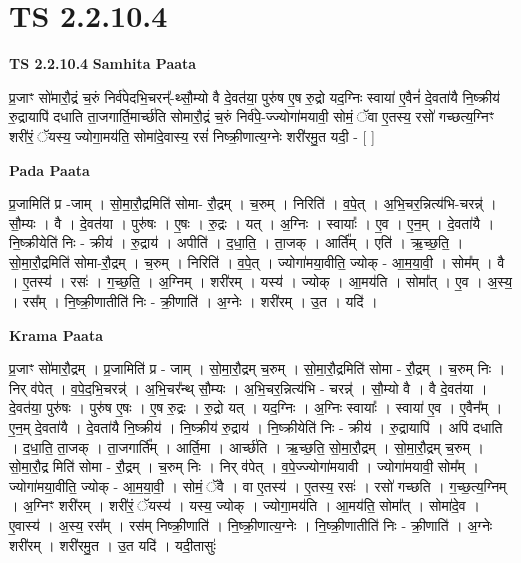 \documentclass[17pt]{extarticle}
\begin{document}
\section{ TS 2.2.10.4 }

\textbf{TS 2.2.10.4 } \newline
\textbf{Samhita Paata} \newline

प्र॒जाꣳ सो॑मारौ॒द्रं च॒रुं निर्व॑पेदभि॒चरन्᳚-थ्सौ॒म्यो वै दे॒वत॑या॒ पुरु॑ष ए॒ष रु॒द्रो यद॒ग्निः स्वाया॑ ए॒वैनं॑ दे॒वता॑यै नि॒ष्क्रीय॑ रु॒द्रायापि॑ दधाति ता॒जगार्ति॒मार्च्छ॑ति सोमारौ॒द्रं च॒रुं निर्व॑पे॒-ज्ज्योगा॑मयावी॒ सोमं॒ ॅवा ए॒तस्य॒ रसो॑ गच्छत्य॒ग्निꣳ शरी॑रं॒ ॅयस्य॒ ज्योगा॒मय॑ति॒ सोमा॑दे॒वास्य॒ रसं॑ निष्क्री॒णात्य॒ग्नेः शरी॑रमु॒त यदी॒ - [  ] \newline

\textbf{Pada Paata} \newline

प्र॒जामिति॑ प्र -जाम् । सो॒मा॒रौ॒द्रमिति॑ सोमा- रौ॒द्रम् । च॒रुम् । निरिति॑ । व॒पे॒त् । अ॒भि॒चर॒न्नित्य॑भि-चरन्न्॑ । सौ॒म्यः । वै । दे॒वत॑या । पुरु॑षः । ए॒षः । रु॒द्रः । यत् । अ॒ग्निः । स्वायाः᳚ । ए॒व । ए॒न॒म् । दे॒वता॑यै । नि॒ष्क्रीयेति॑ निः - क्रीय॑ । रु॒द्राय॑ । अपीति॑ । द॒धा॒ति॒ । ता॒जक् । आर्ति᳚म् । एति॑ । ऋ॒च्छ॒ति॒ । सो॒मा॒रौ॒द्रमिति॑ सोमा-रौ॒द्रम् । च॒रुम् । निरिति॑ । व॒पे॒त् । ज्योगा॑मया॒वीति॒ ज्योक् - आ॒म॒या॒वी॒ । सोम᳚म् । वै । ए॒तस्य॑ । रसः॑ । ग॒च्छ॒ति॒ । अ॒ग्निम् । शरी॑रम् । यस्य॑ । ज्योक् । आ॒मय॑ति । सोमा᳚त् । ए॒व । अ॒स्य॒ । रस᳚म् । नि॒ष्क्री॒णातीति॑ निः - क्री॒णाति॑ । अ॒ग्नेः । शरी॑रम् । उ॒त । यदि॑ ।  \newline


\textbf{Krama Paata} \newline

प्र॒जाꣳ सो॑मारौ॒द्रम् । प्र॒जामिति॑ प्र - जाम् । सो॒मा॒रौ॒द्रम् च॒रुम् । सो॒मा॒रौ॒द्रमिति॑ सोमा - रौ॒द्रम् । च॒रुम् निः । निर् व॑पेत् । व॒पे॒द॒भि॒चरन्न्॑ । अ॒भि॒चर᳚न्थ् सौ॒म्यः । अ॒भि॒चर॒न्नित्य॑भि - चरन्न्॑ । सौ॒म्यो वै । वै दे॒वत॑या । दे॒वत॑या॒ पुरु॑षः । पुरु॑ष ए॒षः । ए॒ष रु॒द्रः । रु॒द्रो यत् । यद॒ग्निः । अ॒ग्निः स्वायाः᳚ । स्वाया॑ ए॒व । ए॒वैन᳚म् । ए॒न॒म् दे॒वता॑यै । दे॒वता॑यै नि॒ष्क्रीय॑ । नि॒ष्क्रीय॑ रु॒द्राय॑ । नि॒ष्क्रीयेति॑ निः - क्रीय॑ । रु॒द्रायापि॑ । अपि॑ दधाति । द॒धा॒ति॒ ता॒जक् । ता॒जगार्ति᳚म् । आर्ति॒मा । आर्च्छ॑ति । ऋ॒च्छ॒ति॒ सो॒मा॒रौ॒द्रम् । सो॒मा॒रौ॒द्रम् च॒रुम् । सो॒मा॒रौ॒द्र मिति॑ सोमा - रौ॒द्रम् । च॒रुम् निः । निर् व॑पेत् । व॒पे॒ज्ज्योगा॑मयावी । ज्योगा॑मयावी॒ सोम᳚म् । ज्योगा॑मया॒वीति॒ ज्योक् - आ॒म॒या॒वी॒ । सोमं॒ ॅवै । वा ए॒तस्य॑ । ए॒तस्य॒ रसः॑ । रसो॑ गच्छति । ग॒च्छ॒त्य॒ग्निम् । अ॒ग्निꣳ शरी॑रम् । शरी॑रं॒ ॅयस्य॑ । यस्य॒ ज्योक् । ज्योगा॒मय॑ति । आ॒मय॑ति॒ सोमा᳚त् । सोमा॑दे॒व । ए॒वास्य॑ । अ॒स्य॒ रस᳚म् । रस॑म् निष्क्री॒णाति॑ । नि॒ष्क्री॒णात्य॒ग्नेः । नि॒ष्क्री॒णातीति॑ निः - क्री॒णाति॑ । अ॒ग्नेः शरी॑रम् । शरी॑रमु॒त । उ॒त यदि॑ । यदी॒तासुः॑ \newline
\end{document}
